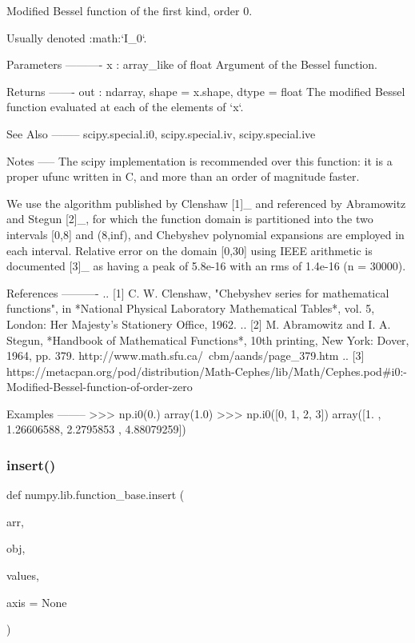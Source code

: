 \begin{DoxyVerb}Modified Bessel function of the first kind, order 0.

Usually denoted :math:`I_0`.

Parameters
----------
x : array_like of float
    Argument of the Bessel function.

Returns
-------
out : ndarray, shape = x.shape, dtype = float
    The modified Bessel function evaluated at each of the elements of `x`.

See Also
--------
scipy.special.i0, scipy.special.iv, scipy.special.ive

Notes
-----
The scipy implementation is recommended over this function: it is a
proper ufunc written in C, and more than an order of magnitude faster.

We use the algorithm published by Clenshaw [1]_ and referenced by
Abramowitz and Stegun [2]_, for which the function domain is
partitioned into the two intervals [0,8] and (8,inf), and Chebyshev
polynomial expansions are employed in each interval. Relative error on
the domain [0,30] using IEEE arithmetic is documented [3]_ as having a
peak of 5.8e-16 with an rms of 1.4e-16 (n = 30000).

References
----------
.. [1] C. W. Clenshaw, "Chebyshev series for mathematical functions", in
       *National Physical Laboratory Mathematical Tables*, vol. 5, London:
       Her Majesty's Stationery Office, 1962.
.. [2] M. Abramowitz and I. A. Stegun, *Handbook of Mathematical
       Functions*, 10th printing, New York: Dover, 1964, pp. 379.
       http://www.math.sfu.ca/~cbm/aands/page_379.htm
.. [3] https://metacpan.org/pod/distribution/Math-Cephes/lib/Math/Cephes.pod#i0:-Modified-Bessel-function-of-order-zero

Examples
--------
>>> np.i0(0.)
array(1.0)
>>> np.i0([0, 1, 2, 3])
array([1.        , 1.26606588, 2.2795853 , 4.88079259])\end{DoxyVerb}
 \mbox{\label{namespacenumpy_1_1lib_1_1function__base_a5d95f04522ad4eeebdfae9f85c1cd9df}} 
\subsubsection{\texorpdfstring{insert()}{insert()}}
{\footnotesize\ttfamily def numpy.\+lib.\+function\+\_\+base.\+insert (\begin{DoxyParamCaption}\item[{}]{arr,  }\item[{}]{obj,  }\item[{}]{values,  }\item[{}]{axis = {\ttfamily None} }\end{DoxyParamCaption})}

